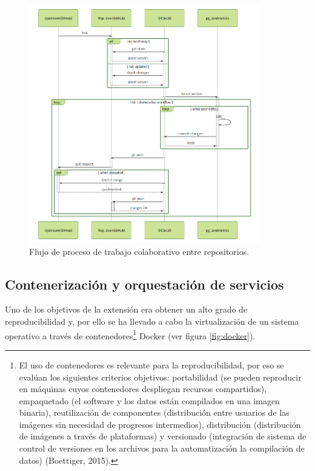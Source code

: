\begin{figure}
\begin{center}
\includegraphics[width=0.9\textwidth]{Metodologia/Figs/pullrequest.png}
\caption{Flujo de proceso de trabajo colaborativo entre repositorios. \label{fig:pullrequest}}
\end{center}
\end{figure}


\subsection{Contenerización y orquestación de servicios}
Uno de los objetivos de la extensión era obtener un alto grado de reproducibilidad y, por ello se ha llevado a cabo la virtualización de un sistema operativo a través de contenedores\footnote{El uso de contenedores es relevante para la reproducibilidad, por eso se evalúan los siguientes criterios objetivos: portabilidad (se pueden reproducir en máquinas cuyos contenedores despliegan recursos compartidos), empaquetado (el software y los datos están compilados en una imagen binaria), reutilización de componentes (distribución entre usuarios de las imágenes sin necesidad de progresos intermedios), distribución (distribución de imágenes a través de plataformas) y versionado (integración de sistema de control de versiones en los archivos para la automatización la compilación de datos) (Boettiger, 2015).} Docker (ver figura \ref{fig:docker}).

